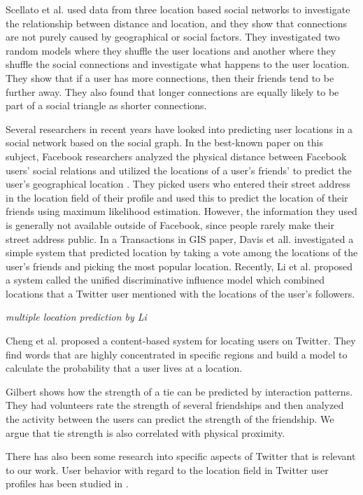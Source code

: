 \documentclass[letterpaper]{article}
\newcommand{\jam}[1]{\emph{#1}}
\begin{document}
Scellato et al. \cite{scellato2011socio} used data from three location based
social networks to investigate the relationship between distance and location,
and they show that connections are not purely caused by geographical or social
factors.  They investigated two random models where they shuffle the user
locations and another where they shuffle the social connections and investigate
what happens to the user location.  They show that if a user has more
connections, then their friends tend to be further away.  They also found that
longer connections are equally likely to be part of a social triangle as
shorter connections.

Several researchers in recent years have looked into predicting user locations
in a social network based on the social graph.
%
In the best-known paper on this subject, Facebook researchers analyzed
the physical distance between Facebook users' social relations and utilized the
locations of a user's friends' to predict the user's geographical location
\cite{backstrom2010find}.
%
They picked users who entered their street address in the location field of
their profile and used this to predict the location of their friends using
maximum likelihood estimation.
%
However, the information they used is generally not available outside of
Facebook, since people rarely make their street address public.
%
In a Transactions in GIS paper, Davis et all. \cite{davis2011infer}
investigated a simple system that predicted location by taking a vote among
the locations of the user's friends and picking the most popular location.
%
Recently, Li et al. \cite{li2012towards} proposed a system called the unified
discriminative influence model which combined locations that a Twitter user
mentioned with the locations of the user's followers.

\jam{multiple location prediction by Li}

Cheng et al. \cite{cheng2010you} proposed a
content-based system for locating users on Twitter. They find words that are
highly concentrated in specific regions and build a model to calculate the
probability that a user lives at a location.

Gilbert \cite{gilbert2009predicting} shows how the strength of a tie can be
predicted by interaction patterns.  They had volunteers rate the strength of
several friendships and then analyzed the activity between the users can
predict the strength of the friendship.  We argue that tie strength is also
correlated with physical proximity.

There has also been some research into specific aspects of Twitter that is
relevant to our work.  User behavior with regard to the location field in
Twitter user profiles has been studied in \cite{hecht2011tweets}.
\end{document}
